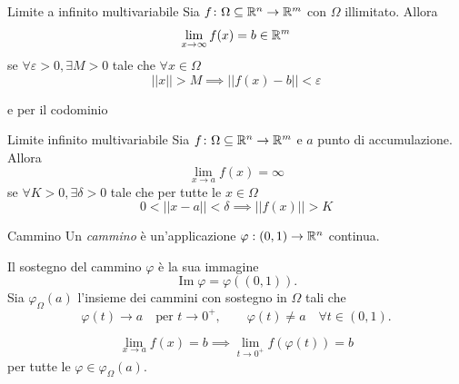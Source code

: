 \documentclass[a4paper]{article}
\begin{document}
\begin{radioactive}
\begin{snippetdefinition}{Limite a infinito multivariabile}
    Sia \(f \colon \Omega \subseteq \mathbb{R}^n \to \mathbb{R}^m\)
    con \(\Omega\) illimitato.
    Allora
    \[
        \lim_{x\to \infty} f(x) = b \in \mathbb{R}^m
    \]
    se \(\forall \varepsilon > 0, \exists M > 0\)
    tale che \(\forall x \in \Omega\)
    \[
        ||x|| > M \implies ||f(x) - b|| < \varepsilon
    \]
\end{snippetdefinition}

e per il codominio

\begin{snippetdefinition}{Limite infinito multivariabile}
    Sia \(f \colon \Omega \subseteq \mathbb{R}^n \to \mathbb{R}^m\)
    e \(a\) punto di accumulazione.
    Allora
    \[
        \lim_{x\to a} f(x) = \infty
    \]
    se \(\forall K > 0, \exists \delta > 0\)
    tale che per tutte le \(x \in \Omega\)
    \[
        0 < ||x-a|| < \delta
        \implies ||f(x)|| > K
    \]
\end{snippetdefinition}
\end{radioactive}

\begin{radioactive}
\begin{snippetdefinition}{Cammino}
    Un \emph{cammino} è un'applicazione \(\varphi: (0,1) \to \mathbb{R}^n\) continua.
\end{snippetdefinition}

Il sostegno del cammino \(\varphi\) è la sua immagine
\[
    \operatorname{Im}\varphi=\varphi((0,1)).
\]
Sia \(\varphi_\Omega(a)\) l'insieme dei cammini con sostegno in \(\Omega\)
tali che
\[
    \varphi(t)\to a\quad\text{per }t\to0^+,
    \qquad
    \varphi(t)\neq a\quad\forall t\in(0,1).
\]

\begin{snippettheorem}{}
    \[
        \lim_{x\to a} f(x) = b
        \implies
        \lim_{t \to 0^+}
        f(\varphi(t)) = b
    \]
    per tutte le \(\varphi \in \varphi_\Omega(a)\).
\end{snippettheorem}
\end{radioactive}
\end{document}
